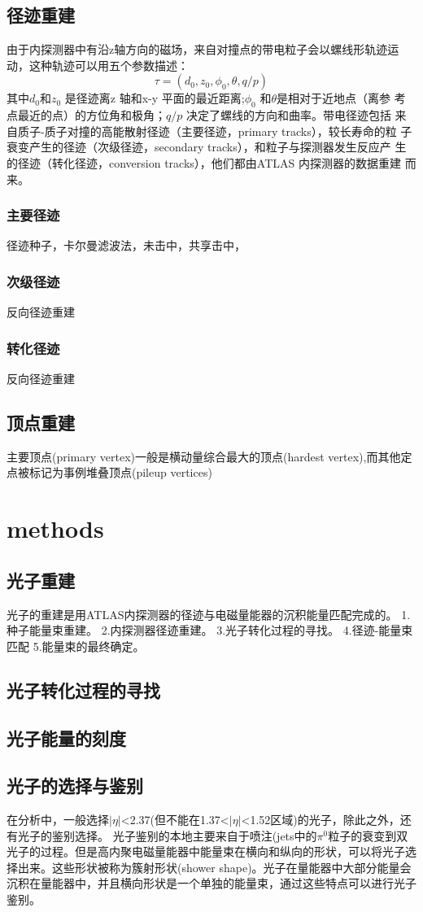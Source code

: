 \documentclass{ctexart}
\begin{document}
\subsection{径迹重建}
由于内探测器中有沿z轴⽅向的磁场，来⾃对撞点的带电粒⼦会以螺线形轨迹运动，这种轨迹可以⽤五个参数描述：
$$\tau=(d_0,z_0,\phi_0,\theta,q/p)$$
其中$d_0$和$z_0$ 是径迹离z 轴和x-y 平⾯的最近距离;$\phi_0$ 和$\theta$是相对于近地点（离参
考点最近的点）的⽅位⾓和极⾓；$q/p$ 决定了螺线的⽅向和曲率。带电径迹包括
来⾃质⼦-质⼦对撞的⾼能散射径迹（主要径迹，primary tracks），较长寿命的粒
⼦衰变产⽣的径迹（次级径迹，secondary tracks），和粒⼦与探测器发⽣反应产
⽣的径迹（转化径迹，conversion tracks），他们都由ATLAS 内探测器的数据重建
⽽来。
\subsubsection{主要径迹}
径迹种子，卡尔曼滤波法，未击中，共享击中，
\subsubsection{次级径迹}
反向径迹重建
\subsubsection{转化径迹}
反向径迹重建
\subsection{顶点重建}
主要顶点(primary vertex)一般是横动量综合最大的顶点(hardest vertex),而其他定点被标记为事例堆叠顶点(pileup vertices)
\section{methods}
\subsection{光子重建}
光子的重建是用ATLAS内探测器的径迹与电磁量能器的沉积能量匹配完成的。
1.种子能量束重建。
2.内探测器径迹重建。
3.光子转化过程的寻找。
4.径迹-能量束匹配
5.能量束的最终确定。
\subsection{光子转化过程的寻找}
\subsection{光子能量的刻度}
\subsection{光子的选择与鉴别}
在分析中，一般选择$|\eta|$<2.37(但不能在1.37<$|\eta|$<1.52区域)的光子，除此之外，还有光子的鉴别选择。
光子鉴别的本地主要来自于喷注(jets中的$\pi^0$粒子的衰变到双光子的过程。但是高内聚电磁量能器中能量束在横向和纵向的形状，可以将光子选择出来。这些形状被称为簇射形状(shower shape)。光子在量能器中大部分能量会沉积在量能器中，并且横向形状是一个单独的能量束，通过这些特点可以进行光子鉴别。
\end{document}
